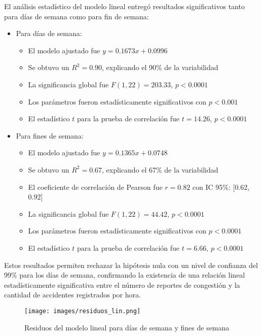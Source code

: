 \documentclass[12pt]{article}
\begin{document}
{El análisis estadístico del modelo lineal entregó resultados significativos tanto para días de semana como para fin de semana:

\begin{itemize}
    \item Para días de semana:
    \begin{itemize}
        \item El modelo ajustado fue $y = 0.1673x + 0.0996$
        \item Se obtuvo un $R^2 = 0.90$, explicando el 90\% de la variabilidad
        \item La significancia global fue $F(1, 22) = 203.33$, $p < 0.0001$
        \item Los parámetros fueron estadísticamente significativos con $p < 0.001$
        \item El estadístico $t$ para la prueba de correlación fue $t = 14.26$, $p < 0.0001$
    \end{itemize}

    \item Para fines de semana:
    \begin{itemize}
        \item El modelo ajustado fue $y = 0.1365x + 0.0748$
        \item Se obtuvo un $R^2 = 0.67$, explicando el 67\% de la variabilidad
        \item El coeficiente de correlación de Pearson fue $r = 0.82$ con IC 95\%: [0.62, 0.92]
        \item La significancia global fue $F(1, 22) = 44.42$, $p < 0.0001$
        \item Los parámetros fueron estadísticamente significativos con $p < 0.0001$
        \item El estadístico $t$ para la prueba de correlación fue $t = 6.66$, $p < 0.0001$
    \end{itemize}
\end{itemize}

Estos resultados permiten rechazar la hipótesis nula con un nivel de confianza del 99\% para los días de semana, confirmando la existencia de una relación lineal estadísticamente significativa entre el número de reportes de congestión y la cantidad de accidentes registrados por hora.

\begin{figure}[H]
\centering
\texttt{[image: images/residuos\_lin.png]}
\caption{Residuos del modelo lineal para días de semana y fines de semana}
\label{fig:resid_lin}
\end{figure}

}
\end{document}
